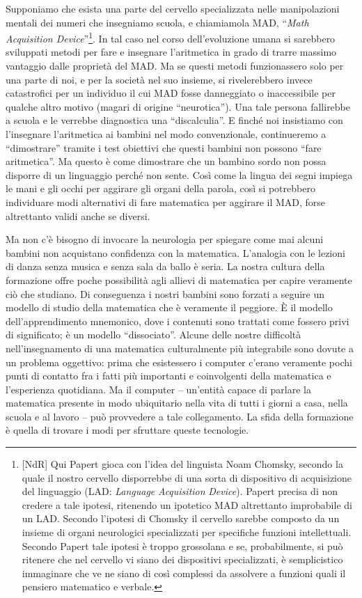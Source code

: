 Supponiamo che esista una parte del cervello specializzata nelle manipolazioni mentali dei numeri che insegniamo scuola, e chiamiamola MAD, “\textit{Math Acquisition Device}”\footnote{[NdR] Qui Papert gioca con l'idea del linguista Noam Chomsky, secondo la quale il nostro cervello disporrebbe di una sorta di dispositivo di acquisizione del linguaggio (LAD: \textit{Language} \textit{Acquisition} \textit{Device}). Papert precisa di non credere a tale ipotesi, ritenendo un ipotetico MAD altrettanto improbabile di un LAD. Secondo l'ipotesi di Chomsky il cervello sarebbe composto da un insieme di organi neurologici specializzati per specifiche funzioni intellettuali. Secondo Papert tale ipotesi è troppo grossolana e se, probabilmente, si può ritenere che nel cervello vi siano dei dispositivi specializzati, è semplicistico immaginare che ve ne siano di così complessi da assolvere a funzioni quali il pensiero matematico e verbale.}. In tal caso nel corso dell'evoluzione umana si sarebbero sviluppati metodi per fare e insegnare l'aritmetica in grado di trarre massimo vantaggio dalle proprietà del MAD. Ma se questi metodi funzionassero solo per una parte di noi, e per la società nel suo insieme, si rivelerebbero invece catastrofici per un individuo il cui MAD fosse danneggiato o inaccessibile per qualche altro motivo (magari di origine “neurotica”). Una tale persona fallirebbe a scuola e le verrebbe diagnostica una “discalculia”. E finché noi insistiamo con l'insegnare l'aritmetica ai bambini nel modo convenzionale, continueremo a “dimostrare” tramite i test obiettivi che questi bambini non  possono “fare aritmetica”. Ma questo è come dimostrare che un bambino sordo non possa disporre di un linguaggio perché non sente. Così come la lingua dei segni impiega le mani e gli occhi per aggirare gli organi della parola, così si potrebbero individuare modi alternativi di fare matematica per aggirare il MAD, forse altrettanto validi anche se diversi.

Ma non c'è bisogno di invocare la neurologia per spiegare come mai alcuni bambini non acquistano confidenza con la matematica. L'analogia con le lezioni di danza senza musica e senza sala da ballo è seria. La nostra cultura della formazione offre poche possibilità agli allievi di matematica per capire veramente ciò che studiano. Di conseguenza i nostri bambini sono forzati a seguire un modello di studio della matematica che è veramente il peggiore. È il modello dell'apprendimento mnemonico, dove i contenuti sono trattati come fossero privi di significato; è un modello “dissociato”. Alcune delle nostre difficoltà nell'insegnamento di una matematica culturalmente più integrabile sono dovute a un problema oggettivo: prima che esistessero i computer c'erano veramente pochi punti di contatto fra i fatti più importanti e coinvolgenti della matematica e l'esperienza quotidiana. Ma il computer – un'entità capace di parlare la matematica presente in modo ubiquitario nella vita di tutti i giorni a casa, nella scuola e al lavoro – può provvedere a tale collegamento. La sfida della formazione è quella di trovare i modi per sfruttare queste tecnologie.

